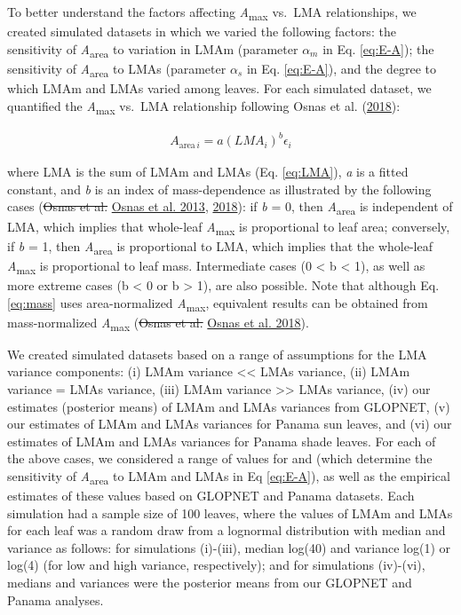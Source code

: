 \documentclass[
  12pt,
]{article}
\providecommand{\DIFdeltex}[1]{{\protect\color{red}\sout{#1}}}                      %
\providecommand{\DIFaddbegin}{} %
\providecommand{\DIFaddend}{} %
\providecommand{\DIFdelbegin}{} %
\providecommand{\DIFdelend}{} %
\providecommand{\DIFdel}[1]{\texorpdfstring{\DIFdeltex{#1}}{}} %
\newcommand{\DIFscaledelfig}{0.5}
\newlength{\DIFdelgraphicswidth} %
\newlength{\DIFdelgraphicsheight} %
\newcommand{\DIFaddincludegraphics}[2][]{{\color{blue}\fbox{\DIFOincludegraphics[#1]{#2}}}} %
\newcommand{\DIFdelincludegraphics}[2][]{%
\sbox{\DIFdelgraphicsbox}{\DIFOincludegraphics[#1]{#2}}%
\settoboxwidth{\DIFdelgraphicswidth}{\DIFdelgraphicsbox} %
\settoboxtotalheight{\DIFdelgraphicsheight}{\DIFdelgraphicsbox} %
\scalebox{\DIFscaledelfig}{%
\parbox[b]{\DIFdelgraphicswidth}{\usebox{\DIFdelgraphicsbox}\\[-\baselineskip] \rule{\DIFdelgraphicswidth}{0em}}\llap{\resizebox{\DIFdelgraphicswidth}{\DIFdelgraphicsheight}{%
\setlength{\unitlength}{\DIFdelgraphicswidth}%
\begin{picture}(1,1)%
\thicklines\linethickness{2pt} %
{\color[rgb]{1,0,0}\put(0,0){\framebox(1,1){}}}%
{\color[rgb]{1,0,0}\put(0,0){\line( 1,1){1}}}%
{\color[rgb]{1,0,0}\put(0,1){\line(1,-1){1}}}%
\end{picture}%
}\hspace*{3pt}}} %
} %
\DeclareRobustCommand{\DIFaddbegin}{\DIFOaddbegin \let\includegraphics\DIFaddincludegraphics} %
\DeclareRobustCommand{\DIFaddend}{\DIFOaddend \let\includegraphics\DIFOincludegraphics} %
\DeclareRobustCommand{\DIFdelbegin}{\DIFOdelbegin \let\includegraphics\DIFdelincludegraphics} %
\DeclareRobustCommand{\DIFdelend}{\DIFOaddend \let\includegraphics\DIFOincludegraphics} %
\begin{document}
To better understand the factors affecting \emph{A}\textsubscript{max} vs.~LMA relationships, we created simulated datasets in which we varied the following factors: the sensitivity of \emph{A}\textsubscript{area} to variation in LMAm (parameter \(\alpha_m\) in Eq. \eqref{eq:E-A}); the sensitivity of \emph{A}\textsubscript{area} to LMAs (parameter \(\alpha_s\) in Eq. \eqref{eq:E-A}), and the degree to which LMAm and LMAs varied among leaves.
For each simulated dataset, we quantified the \emph{A}\textsubscript{max} vs.~LMA relationship following Osnas et al. (\protect\hyperlink{ref-Osnas2018}{2018}):

\begin{align}
A_{\mathrm{area} \, i} = a (LMA_i)^{b}\epsilon_i \label{eq:mass}
\end{align}

where LMA is the sum of LMAm and LMAs (Eq. \eqref{eq:LMA}), \emph{a} is a fitted constant, and \emph{b} is an index of mass-dependence as illustrated by the following cases (\DIFdelbegin \DIFdel{Osnas et al. }\DIFdelend \protect\DIFdelbegin %
\DIFdelend \DIFaddbegin \hyperlink{ref-Osnas2013}{Osnas et al. 2013}\DIFaddend , \protect\hyperlink{ref-Osnas2018}{2018}): if \emph{b} = 0, then \emph{A}\textsubscript{area} is independent of LMA, which implies that whole-leaf \emph{A}\textsubscript{max} is proportional to leaf area; conversely, if \emph{b} = 1, then \emph{A}\textsubscript{area} is proportional to LMA, which implies that the whole-leaf \emph{A}\textsubscript{max} is proportional to leaf mass.
Intermediate cases (0 \textless{} b \textless{} 1), as well as more extreme cases (b \textless{} 0 or b \textgreater{} 1), are also possible.
Note that although Eq. \eqref{eq:mass} uses area-normalized \emph{A}\textsubscript{max}, equivalent results can be obtained from mass-normalized \emph{A}\textsubscript{max} (\DIFdelbegin \DIFdel{Osnas et al. }\DIFdelend \protect\DIFdelbegin %
\DIFdelend \DIFaddbegin \hyperlink{ref-Osnas2018}{Osnas et al. 2018}\DIFaddend ).

We created simulated datasets based on a range of assumptions for the LMA variance components: (i) LMAm variance \textless\textless{} LMAs variance, (ii) LMAm variance = LMAs variance, (iii) LMAm variance \textgreater\textgreater{} LMAs variance, (iv) our estimates (posterior means) of LMAm and LMAs variances from GLOPNET, (v) our estimates of LMAm and LMAs variances for Panama sun leaves, and (vi) our estimates of LMAm and LMAs variances for Panama shade leaves.
For each of the above cases, we considered a range of values for and (which determine the sensitivity of \emph{A}\textsubscript{area} to LMAm and LMAs in Eq \eqref{eq:E-A}), as well as the empirical estimates of these values based on GLOPNET and Panama datasets.
Each simulation had a sample size of 100 leaves, where the values of LMAm and LMAs for each leaf was a random draw from a lognormal distribution with median and variance as follows: for simulations (i)-(iii), median log(40) and variance log(1) or log(4) (for low and high variance, respectively); and for simulations (iv)-(vi), medians and variances were the posterior means from our GLOPNET and Panama analyses.
\end{document}
